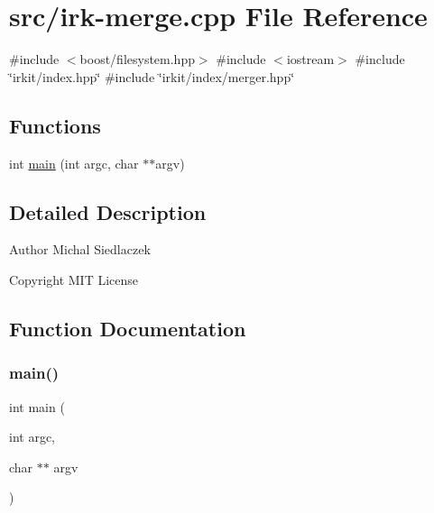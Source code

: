 \hypertarget{irk-merge_8cpp}{}\section{src/irk-\/merge.cpp File Reference}
\label{irk-merge_8cpp}
{\ttfamily \#include $<$boost/filesystem.\+hpp$>$}\newline
{\ttfamily \#include $<$iostream$>$}\newline
{\ttfamily \#include \char`\"{}irkit/index.\+hpp\char`\"{}}\newline
{\ttfamily \#include \char`\"{}irkit/index/merger.\+hpp\char`\"{}}\newline
\subsection*{Functions}
\begin{DoxyCompactItemize}
\item 
int \mbox{\hyperlink{irk-merge_8cpp_a3c04138a5bfe5d72780bb7e82a18e627}{main}} (int argc, char $\ast$$\ast$argv)
\end{DoxyCompactItemize}


\subsection{Detailed Description}
\begin{DoxyAuthor}{Author}
Michal Siedlaczek 
\end{DoxyAuthor}
\begin{DoxyCopyright}{Copyright}
M\+IT License 
\end{DoxyCopyright}


\subsection{Function Documentation}
\mbox{\label{irk-merge_8cpp_a3c04138a5bfe5d72780bb7e82a18e627}} 
\subsubsection{\texorpdfstring{main()}{main()}}
{\footnotesize\ttfamily int main (\begin{DoxyParamCaption}\item[{int}]{argc,  }\item[{char $\ast$$\ast$}]{argv }\end{DoxyParamCaption})}

